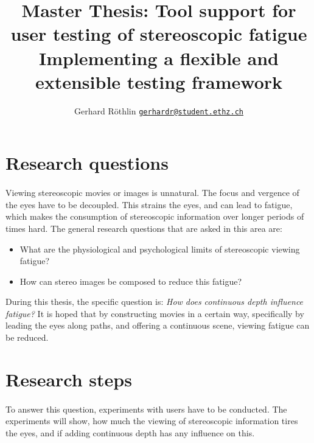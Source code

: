 \documentclass[11pt]{scrartcl}
\title{Master Thesis: Tool support for user testing of stereoscopic fatigue\\
{\large Implementing a flexible and extensible testing framework}}
\author{\normalsize Gerhard R\"othlin 
{\tt  \href{mailto:gerhardr@student.ethz.ch}{gerhardr@student.ethz.ch}}}
\date{}
\begin{document}
\maketitle



\begin{multicols}{2}


\section{Research questions}
\paragraph{}
Viewing stereoscopic movies or images is unnatural. The focus and vergence of the eyes have to be decoupled. This strains the eyes, and can lead to fatigue, which makes the consumption of stereoscopic information over longer periods of times hard. The general research questions that are asked in this area are:
\begin{itemize}
\item What are the physiological and psychological limits of stereoscopic viewing fatigue?
\item How can stereo images be composed to reduce this fatigue?
\end{itemize}

\cbstart
During this thesis, the specific question is: {\it How does continuous depth influence fatigue?} It is hoped that by constructing movies in a certain way, specifically by leading the eyes along paths, and offering a continuous scene, viewing fatigue can be reduced.
\cbend

\cbstart
\section{Research steps}
\paragraph{}
To answer this question, experiments with users have to be conducted. The experiments will show, how much the viewing of stereoscopic information tires the eyes, and if adding continuous depth has any influence on this.


\end{multicols}
\end{document}
